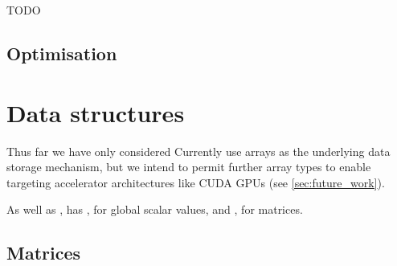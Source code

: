 \documentclass[thesis]{subfiles}
\begin{document}
\begin{example}

\begin{listing}
  \centering
  \begin{minipage}{.8\textwidth}
    \inputminted{c}{./scripts/artefacts/codegen_example2_c_code_tidy.c}
  \end{minipage}
  \caption{
    TODO
  }
  \label{listing:codegen_example2_c_code}
\end{listing}


\end{example}

\subsection{Optimisation}
\label{sec:codegen_optimisation}


\section{Data structures}
\label{sec:data_structures}

Thus far we have only considered
Currently  use \numpy arrays as the underlying data storage mechanism, but we intend to permit further array types to enable targeting accelerator architectures like CUDA GPUs (see \cref{sec:future_work}).

As well as ,  has , for global scalar values, and , for matrices.


\subsection{Matrices}
\label{sec:impl_matrices}
\end{document}
